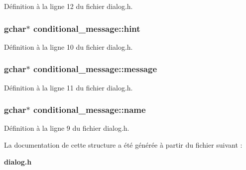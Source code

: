Définition à la ligne 12 du fichier dialog.h.

\subsubsection[{hint}]{\setlength{\rightskip}{0pt plus 5cm}gchar$\ast$ {\bf conditional\_\-message::hint}}\label{structconditional__message_ad37bea820f28d42ca263f278ddd3bcbe}


Définition à la ligne 10 du fichier dialog.h.

\subsubsection[{message}]{\setlength{\rightskip}{0pt plus 5cm}gchar$\ast$ {\bf conditional\_\-message::message}}\label{structconditional__message_a1ac78264fd28b6819d5bfaa1e9b0ef39}


Définition à la ligne 11 du fichier dialog.h.

\subsubsection[{name}]{\setlength{\rightskip}{0pt plus 5cm}gchar$\ast$ {\bf conditional\_\-message::name}}\label{structconditional__message_a28fcfb79edb0fdb1b5ee82ebb118fce8}


Définition à la ligne 9 du fichier dialog.h.



La documentation de cette structure a été générée à partir du fichier suivant :\begin{DoxyCompactItemize}
\item 
{\bf dialog.h}\end{DoxyCompactItemize}
